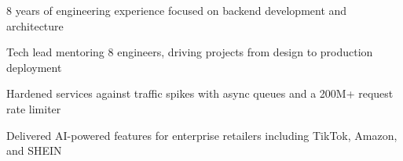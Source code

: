 \begin{cventries}
  \cventryr
    {}
    {}
    {}
    {}
    {
    \begin{cvitems}
    \item{{8 years of engineering experience focused on backend development and architecture}}
    \vspace{1mm}
    \item{{Tech lead mentoring 8 engineers, driving projects from design to production deployment}}
    \vspace{1mm}
    \item{{Hardened services against traffic spikes with async queues and a 200M+ request rate limiter}}
    \vspace{1mm}
    \item{{Delivered AI-powered features for enterprise retailers including TikTok, Amazon, and SHEIN}}
    \end{cvitems}
    }
\end{cventries}